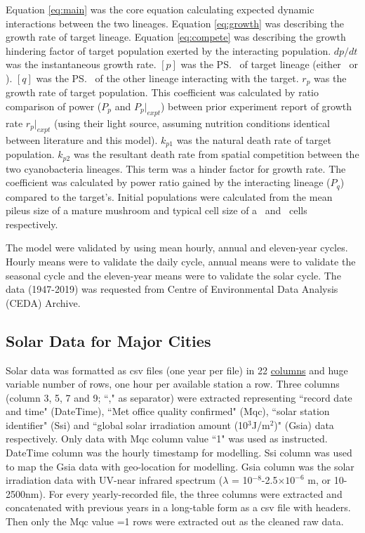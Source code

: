 \documentclass[../thesis.tex]{subfiles} %
\begin{document}
Equation \ref{eq:main} was the core equation calculating expected dynamic interactions between the two lineages.  Equation \ref{eq:growth} was describing the growth rate of target lineage.  Equation \ref{eq:compete} was describing the growth hindering factor of target population exerted by the interacting population.  $dp/dt$ was the instantaneous growth rate.  $[p]$ was the \ps\ of target lineage (either \Ss\ or \Cs).  $[q]$ was the \ps\ of the other lineage interacting with the target.  $r_p$ was the growth rate of target population.  This coefficient was calculated by ratio comparison of power ($P_p$ and $P_p|_{expt}$) between prior experiment report of growth rate $r_p|_{expt}$ (using their light source, assuming nutrition conditions identical between literature and this model).  $k_{p1}$ was the natural death rate of target population.  $k_{p2}$ was the resultant death rate from spatial competition between the two cyanobacteria lineages.  This term was a hinder factor for growth rate.  The coefficient was calculated by power ratio gained by the interacting lineage ($P_q$) compared to the target's.  Initial populations were calculated from the mean pileus size of a mature mushroom and typical cell size of a \Ss\ and \Ct\ cells respectively.

The model were validated by using mean hourly, annual and eleven-year cycles.  Hourly means were to validate the daily cycle, annual means were to validate the seasonal cycle and the eleven-year means were to validate the solar cycle.  The data (1947-2019) was requested from Centre of Environmental Data Analysis (CEDA) Archive.\autocite{solarData}

\subsection{Solar Data for Major Cities} %
Solar data was formatted as csv files (one year per file) in 22 \href{https://artefacts.ceda.ac.uk/badc_datadocs/ukmo-midas/RO_Table.html#definition}{columns} and huge variable number of rows, one hour per available station a row.  Three columns (column 3, 5, 7 and 9; ``," as separator) were extracted representing ``record date and time" (DateTime), ``Met office quality confirmed" (Mqc), ``solar station identifier" (Ssi) and ``global solar irradiation amount (10$^{3}$J/m$^{2}$)" (Gsia) data respectively.  Only data with Mqc column value ``1" was used as instructed.  DateTime column was the hourly timestamp for modelling. Ssi column was used to map the Gsia data with geo-location for modelling.  Gsia column was the solar irradiation data with UV-near infrared spectrum ($\lambda$ = 10$^{-8}$-2.5$\times10^{-6}$ m, or 10-2500nm).  For every yearly-recorded file, the three columns were extracted and concatenated with previous years in a long-table form as a csv file with headers.  Then only the Mqc value =1 rows were extracted out as the cleaned raw data.
\end{document}
